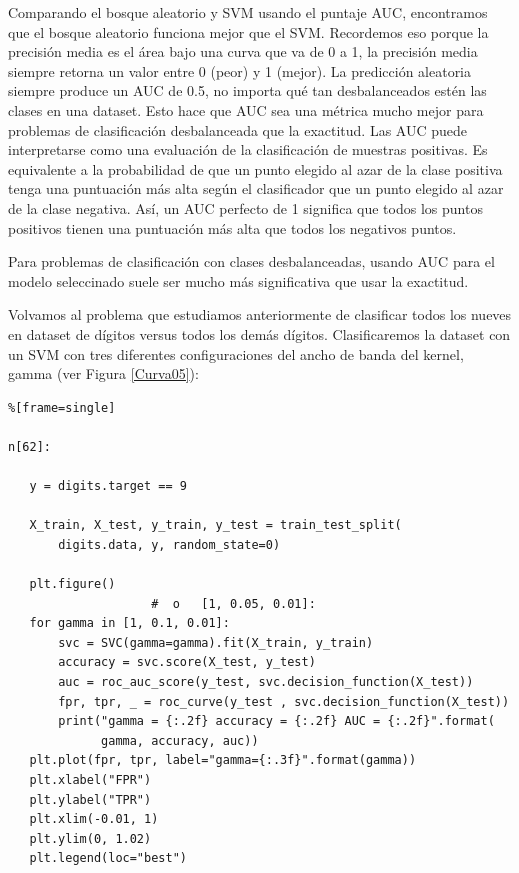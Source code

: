 {\begin{lstlisting}
\end{lstlisting}


Comparando el bosque aleatorio y SVM usando el puntaje AUC, encontramos que el bosque aleatorio
funciona  mejor que el SVM. Recordemos eso porque la precisión media
 es el área bajo una curva que va de 0 a 1, la precisión media siempre retorna 
un valor entre 0 (peor) y 1 (mejor). La predicción aleatoria siempre produce un AUC
de 0.5, no importa qué tan desbalanceados  estén las clases en una dataset. 
Esto hace que AUC sea una  métrica mucho mejor para problemas de clasificación desbalanceada que la exactitud.  Las AUC puede interpretarse como una evaluación de la clasificación de muestras positivas. Es equivalente a la probabilidad de que un punto elegido al azar de la clase positiva tenga una puntuación más alta  según el clasificador que un punto elegido al azar de la clase negativa.   Así, un  AUC perfecto de 1 significa que todos los puntos positivos tienen una puntuación más alta que todos los negativos puntos.

Para problemas de clasificación con clases desbalanceadas, usando AUC para el modelo
 seleccinado suele ser mucho más significativa que usar la exactitud.

Volvamos al problema que estudiamos anteriormente de clasificar todos los nueves en dataset de dígitos
 versus todos los demás dígitos.  Clasificaremos la dataset con un SVM con tres diferentes
configuraciones  del ancho de banda del kernel, gamma (ver Figura \ref{Curva05}):


\begin{lstlisting}%[frame=single]

n[62]:

   y = digits.target == 9
   
   X_train, X_test, y_train, y_test = train_test_split(
       digits.data, y, random_state=0)
   
   plt.figure()
                    #  o   [1, 0.05, 0.01]:
   for gamma in [1, 0.1, 0.01]:         
       svc = SVC(gamma=gamma).fit(X_train, y_train)
       accuracy = svc.score(X_test, y_test)
       auc = roc_auc_score(y_test, svc.decision_function(X_test))
       fpr, tpr, _ = roc_curve(y_test , svc.decision_function(X_test))
       print("gamma = {:.2f} accuracy = {:.2f} AUC = {:.2f}".format(
             gamma, accuracy, auc))
   plt.plot(fpr, tpr, label="gamma={:.3f}".format(gamma))
   plt.xlabel("FPR")
   plt.ylabel("TPR")
   plt.xlim(-0.01, 1)
   plt.ylim(0, 1.02)
   plt.legend(loc="best")


\end{lstlisting}}
